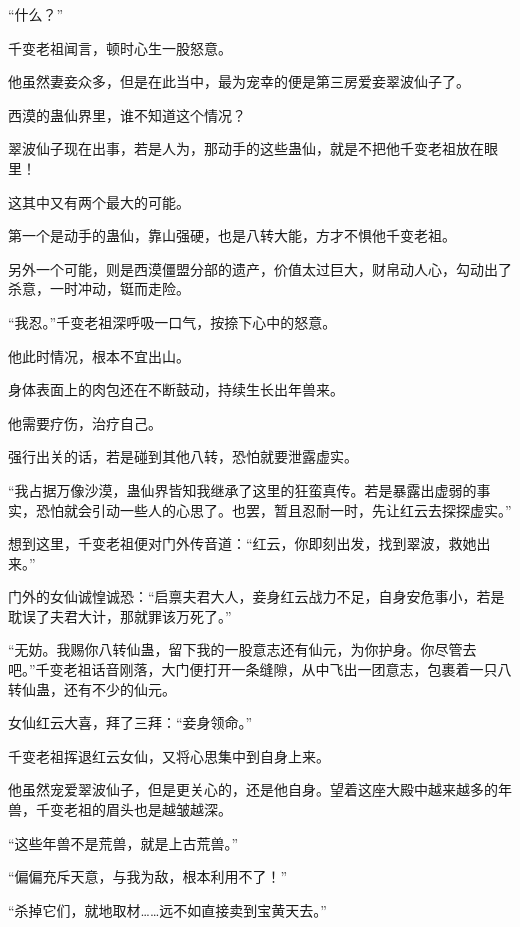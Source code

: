 
\begin{this_body}



“什么？”

千变老祖闻言，顿时心生一股怒意。

他虽然妻妾众多，但是在此当中，最为宠幸的便是第三房爱妾翠波仙子了。

西漠的蛊仙界里，谁不知道这个情况？

翠波仙子现在出事，若是人为，那动手的这些蛊仙，就是不把他千变老祖放在眼里！

这其中又有两个最大的可能。

第一个是动手的蛊仙，靠山强硬，也是八转大能，方才不惧他千变老祖。

另外一个可能，则是西漠僵盟分部的遗产，价值太过巨大，财帛动人心，勾动出了杀意，一时冲动，铤而走险。

“我忍。”千变老祖深呼吸一口气，按捺下心中的怒意。

他此时情况，根本不宜出山。

身体表面上的肉包还在不断鼓动，持续生长出年兽来。

他需要疗伤，治疗自己。

强行出关的话，若是碰到其他八转，恐怕就要泄露虚实。

“我占据万像沙漠，蛊仙界皆知我继承了这里的狂蛮真传。若是暴露出虚弱的事实，恐怕就会引动一些人的心思了。也罢，暂且忍耐一时，先让红云去探探虚实。”

想到这里，千变老祖便对门外传音道：“红云，你即刻出发，找到翠波，救她出来。”

门外的女仙诚惶诚恐：“启禀夫君大人，妾身红云战力不足，自身安危事小，若是耽误了夫君大计，那就罪该万死了。”

“无妨。我赐你八转仙蛊，留下我的一股意志还有仙元，为你护身。你尽管去吧。”千变老祖话音刚落，大门便打开一条缝隙，从中飞出一团意志，包裹着一只八转仙蛊，还有不少的仙元。

女仙红云大喜，拜了三拜：“妾身领命。”

千变老祖挥退红云女仙，又将心思集中到自身上来。

他虽然宠爱翠波仙子，但是更关心的，还是他自身。望着这座大殿中越来越多的年兽，千变老祖的眉头也是越皱越深。

“这些年兽不是荒兽，就是上古荒兽。”

“偏偏充斥天意，与我为敌，根本利用不了！”

“杀掉它们，就地取材……远不如直接卖到宝黄天去。”


\end{this_body}
